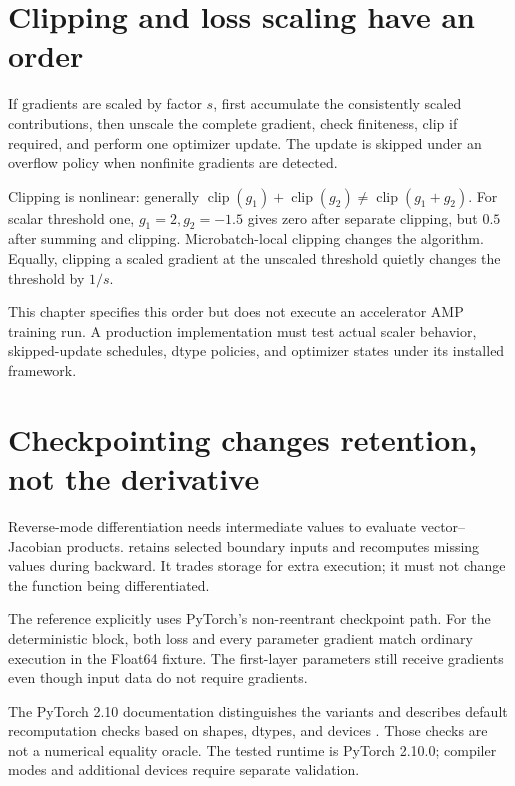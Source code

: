\section{Clipping and loss scaling have an order}
If gradients are scaled by factor $s$, first accumulate the consistently scaled
contributions, then unscale the complete gradient, check finiteness, clip if
required, and perform one optimizer update. The update is skipped under an
overflow policy when nonfinite gradients are detected.

Clipping is nonlinear: generally
$\operatorname{clip}(g_1)+\operatorname{clip}(g_2)
\ne\operatorname{clip}(g_1+g_2)$.
For scalar threshold one, $g_1=2,g_2=-1.5$ gives zero after separate clipping,
but $0.5$ after summing and clipping. Microbatch-local clipping changes the
algorithm. Equally, clipping a scaled gradient at the unscaled threshold
quietly changes the threshold by $1/s$.

This chapter specifies this order but does not execute an accelerator AMP training
run. A production implementation must test actual scaler behavior, skipped-update
schedules, dtype policies, and optimizer states under its installed framework.

\section{Checkpointing changes retention, not the derivative}
Reverse-mode differentiation needs intermediate values to evaluate vector--Jacobian
products.  retains selected boundary inputs and recomputes
missing values during backward. It trades storage for extra execution; it must not
change the function being differentiated.

The reference explicitly uses PyTorch's non-reentrant checkpoint path. For the
deterministic block, both loss and every parameter gradient match ordinary
execution in the Float64 fixture. The first-layer parameters still receive
gradients even though input data do not require gradients.

The PyTorch 2.10 documentation distinguishes the variants and describes default
recomputation checks based on shapes, dtypes, and devices \cite{torch-checkpoint}.
Those checks are not a numerical equality oracle. The tested runtime is
PyTorch 2.10.0; compiler modes and additional devices require separate validation.

